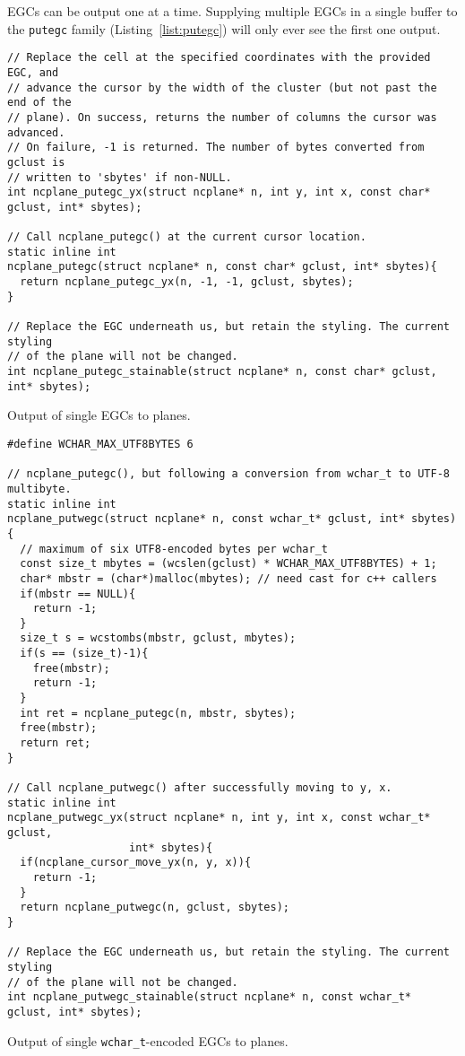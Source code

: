 EGCs can be output one at a time. Supplying multiple EGCs in a single buffer
to the \texttt{putegc} family (Listing~\ref{list:putegc}) will only ever see the first one output.

\begin{listing}[!htbp]
\begin{verbatim}
// Replace the cell at the specified coordinates with the provided EGC, and
// advance the cursor by the width of the cluster (but not past the end of the
// plane). On success, returns the number of columns the cursor was advanced.
// On failure, -1 is returned. The number of bytes converted from gclust is
// written to 'sbytes' if non-NULL.
int ncplane_putegc_yx(struct ncplane* n, int y, int x, const char* gclust, int* sbytes);

// Call ncplane_putegc() at the current cursor location.
static inline int
ncplane_putegc(struct ncplane* n, const char* gclust, int* sbytes){
  return ncplane_putegc_yx(n, -1, -1, gclust, sbytes);
}

// Replace the EGC underneath us, but retain the styling. The current styling
// of the plane will not be changed.
int ncplane_putegc_stainable(struct ncplane* n, const char* gclust, int* sbytes);
\end{verbatim}
\caption{Output of single EGCs to planes.}
\label{list:putegc}
\end{listing}

\begin{listing}[!htbp]
\begin{verbatim}
#define WCHAR_MAX_UTF8BYTES 6

// ncplane_putegc(), but following a conversion from wchar_t to UTF-8 multibyte.
static inline int
ncplane_putwegc(struct ncplane* n, const wchar_t* gclust, int* sbytes){
  // maximum of six UTF8-encoded bytes per wchar_t
  const size_t mbytes = (wcslen(gclust) * WCHAR_MAX_UTF8BYTES) + 1;
  char* mbstr = (char*)malloc(mbytes); // need cast for c++ callers
  if(mbstr == NULL){
    return -1;
  }
  size_t s = wcstombs(mbstr, gclust, mbytes);
  if(s == (size_t)-1){
    free(mbstr);
    return -1;
  }
  int ret = ncplane_putegc(n, mbstr, sbytes);
  free(mbstr);
  return ret;
}

// Call ncplane_putwegc() after successfully moving to y, x.
static inline int
ncplane_putwegc_yx(struct ncplane* n, int y, int x, const wchar_t* gclust,
                   int* sbytes){
  if(ncplane_cursor_move_yx(n, y, x)){
    return -1;
  }
  return ncplane_putwegc(n, gclust, sbytes);
}

// Replace the EGC underneath us, but retain the styling. The current styling
// of the plane will not be changed.
int ncplane_putwegc_stainable(struct ncplane* n, const wchar_t* gclust, int* sbytes);
\end{verbatim}
\caption{Output of single \texttt{wchar\_t}-encoded EGCs to planes.}
\label{list:putwegc}
\end{listing}

